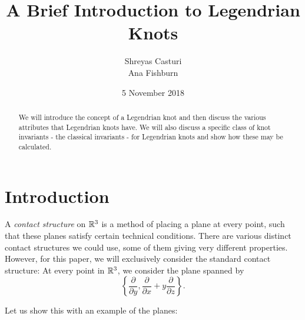 \documentclass{article}
\title{A Brief Introduction to Legendrian Knots}
\author{Shreyas Casturi\\Ana Fishburn}
\date{5 November 2018}
\begin{document}
\maketitle

\begin{abstract}
    We will introduce the concept of a Legendrian knot and then discuss
    the various attributes that Legendrian knots have. %
    We will also discuss
    a specific class of knot invariants - the classical invariants - for
    Legendrian knots and show how these may be calculated.
\end{abstract}

\section{Introduction}
A {\it contact structure} on $\mathbb{R}^3$ is a method of placing a plane at every point,
such that these planes satisfy certain technical conditions.
There are various distinct contact structures we could use, some of them giving
very different properties.
However, for this paper, we will exclusively consider the standard contact structure:
At every point in $\mathbb{R}^3$, we consider the plane spanned by
\[\left\{\frac{\partial}{\partial y},\frac{\partial}{\partial x} + y\frac{\partial}{\partial z}\right\}.\]

Let us show this with an example of the planes:
\end{document}
